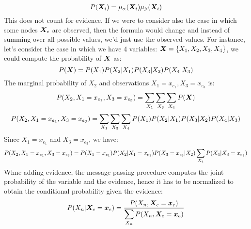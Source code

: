 \[P(\bm{X}_i)=\mu_\alpha(\bm{X}_i)\mu_\beta(\bm{X}_i)\]
This does not count for evidence. If we were to consider also the case in which some nodes $\bm{X}_e$ are observed, then the formula would change and instead of summing over all possible values, we'd just use the observed values. For instance, let's consider the case in which we have 4 variables: $\bm{X}=\{X_1,X_2,X_3,X_4\}$, we could compute the probability of $\bm{X}$ as:
\[P(\bm{X})=P(X_1)P(X_2\vert X_1)P(X_3\vert X_2)P(X_4\vert X_3)\]
The marginal probability of $X_2$ and observations $X_1=x_{e_1}, X_3=x_{e_3}$ is:
\[P(X_2,X_1=x_{e_1},X_3=x_{e_3})=\displaystyle\sum_{X_1}\displaystyle\sum_{X_3}\displaystyle\sum_{X_4}P(\bm{X})\]
\[P(X_2,X_1=x_{e_1},X_3=x_{e_3})=\displaystyle\sum_{X_1}\displaystyle\sum_{X_3}\displaystyle\sum_{X_4}P(X_1)P(X_2\vert X_1)P(X_3\vert X_2)P(X_4\vert X_3)\]
Since $X_1=x_{e_1}$ and $X_3=x_{e_3}$, we have:
\[P(X_2,X_1=x_{e_1},X_3=x_{e_3})=P(X_1=x_{e_1})P(X_2\vert X_1=x_{e_1})P(X_3=x_{e_3}\vert X_2)\displaystyle\sum_{X_4}P(X_4\vert X_3=x_{e_3})\]
Whne adding evidence, the message passing procedure computes the joint probability of the variable and the evidence, hence it has to be normalized to obtain the conditional probability given the evidence:
\[P(X_n\vert \bm{X}_e=\bm{x}_e)=\dfrac{P(X_n, \bm{X}_e=\bm{x}_e)}{\displaystyle\sum_{X_n}P(X_n,\bm{X}_e=\bm{x}_e)}\]
%
%
